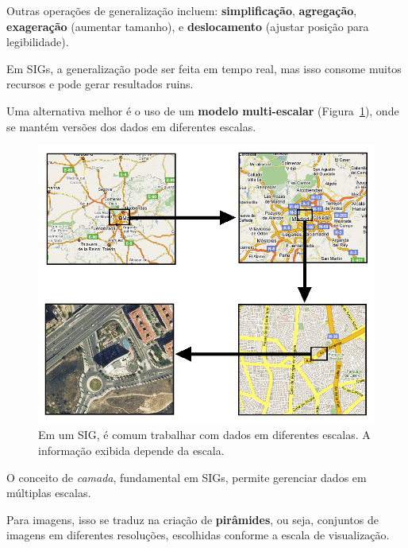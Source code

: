 Outras operações de generalização incluem: 
\textbf{simplificação}, \textbf{agregação}, \textbf{exageração} (aumentar tamanho), e \textbf{deslocamento} (ajustar posição para legibilidade).

Em SIGs, a generalização pode ser feita em tempo real, mas isso consome muitos recursos e pode gerar resultados ruins.

Uma alternativa melhor é o uso de um \textbf{modelo multi-escalar} (Figura~\ref{Fig:SIG_multi_escala}), onde se mantém versões dos dados em diferentes escalas.

\begin{figure}[!hbt]
\centering
\includegraphics[width=\textwidth]{Fundamentos_cartograficos/SIG_multi_escala.png}
\caption{\small Em um SIG, é comum trabalhar com dados em diferentes escalas. A informação exibida depende da escala.}
\label{Fig:SIG_multi_escala} 
\end{figure}

O conceito de \emph{camada}, fundamental em SIGs, permite gerenciar dados em múltiplas escalas.

Para imagens, isso se traduz na criação de \textbf{pirâmides}, ou seja, conjuntos de imagens em diferentes resoluções, escolhidas conforme a escala de visualização.

\pagestyle{empty}
